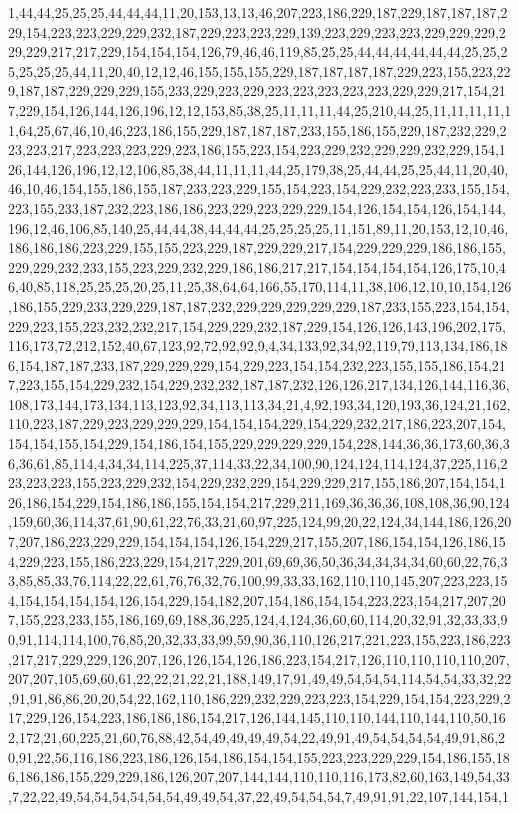 1,44,44,25,25,25,44,44,44,11,20,153,13,13,46,207,223,186,229,187,229,187,187,187,229,154,223,223,229,229,232,187,229,223,223,229,139,223,229,223,223,229,229,229,229,229,217,217,229,154,154,154,126,79,46,46,119,85,25,25,44,44,44,44,44,44,25,25,25,25,25,25,44,11,20,40,12,12,46,155,155,155,229,187,187,187,187,229,223,155,223,229,187,187,229,229,229,155,233,229,223,229,223,223,223,223,223,229,229,217,154,217,229,154,126,144,126,196,12,12,153,85,38,25,11,11,11,44,25,210,44,25,11,11,11,11,11,64,25,67,46,10,46,223,186,155,229,187,187,187,233,155,186,155,229,187,232,229,223,223,217,223,223,223,229,223,186,155,223,154,223,229,232,229,229,232,229,154,126,144,126,196,12,12,106,85,38,44,11,11,11,44,25,179,38,25,44,44,25,25,44,11,20,40,46,10,46,154,155,186,155,187,233,223,229,155,154,223,154,229,232,223,233,155,154,223,155,233,187,232,223,186,186,223,229,223,229,229,154,126,154,154,126,154,144,196,12,46,106,85,140,25,44,44,38,44,44,44,25,25,25,25,11,151,89,11,20,153,12,10,46,186,186,186,223,229,155,155,223,229,187,229,229,217,154,229,229,229,186,186,155,229,229,232,233,155,223,229,232,229,186,186,217,217,154,154,154,154,126,175,10,46,40,85,118,25,25,25,20,25,11,25,38,64,64,166,55,170,114,11,38,106,12,10,10,154,126,186,155,229,233,229,229,187,187,232,229,229,229,229,229,187,233,155,223,154,154,229,223,155,223,232,232,217,154,229,229,232,187,229,154,126,126,143,196,202,175,116,173,72,212,152,40,67,123,92,72,92,92,9,4,34,133,92,34,92,119,79,113,134,186,186,154,187,187,233,187,229,229,229,154,229,223,154,154,232,223,155,155,186,154,217,223,155,154,229,232,154,229,232,232,187,187,232,126,126,217,134,126,144,116,36,108,173,144,173,134,113,123,92,34,113,113,34,21,4,92,193,34,120,193,36,124,21,162,110,223,187,229,223,229,229,229,154,154,154,229,154,229,232,217,186,223,207,154,154,154,155,154,229,154,186,154,155,229,229,229,229,154,228,144,36,36,173,60,36,36,36,61,85,114,4,34,34,114,225,37,114,33,22,34,100,90,124,124,114,124,37,225,116,223,223,223,155,223,229,232,154,229,232,229,154,229,229,217,155,186,207,154,154,126,186,154,229,154,186,186,155,154,154,217,229,211,169,36,36,36,108,108,36,90,124,159,60,36,114,37,61,90,61,22,76,33,21,60,97,225,124,99,20,22,124,34,144,186,126,207,207,186,223,229,229,154,154,154,126,154,229,217,155,207,186,154,154,126,186,154,229,223,155,186,223,229,154,217,229,201,69,69,36,50,36,34,34,34,34,60,60,22,76,33,85,85,33,76,114,22,22,61,76,76,32,76,100,99,33,33,162,110,110,145,207,223,223,154,154,154,154,154,126,154,229,154,182,207,154,186,154,154,223,223,154,217,207,207,155,223,233,155,186,169,69,188,36,225,124,4,124,36,60,60,114,20,32,91,32,33,33,90,91,114,114,100,76,85,20,32,33,33,99,59,90,36,110,126,217,221,223,155,223,186,223,217,217,229,229,126,207,126,126,154,126,186,223,154,217,126,110,110,110,110,207,207,207,105,69,60,61,22,22,21,22,21,188,149,17,91,49,49,54,54,54,114,54,54,33,32,22,91,91,86,86,20,20,54,22,162,110,186,229,232,229,223,223,154,229,154,154,223,229,217,229,126,154,223,186,186,186,154,217,126,144,145,110,110,144,110,144,110,50,162,172,21,60,225,21,60,76,88,42,54,49,49,49,49,54,22,49,91,49,54,54,54,54,49,91,86,20,91,22,56,116,186,223,186,126,154,186,154,154,155,223,223,229,229,154,186,155,186,186,186,155,229,229,186,126,207,207,144,144,110,110,116,173,82,60,163,149,54,33,7,22,22,49,54,54,54,54,54,54,49,49,54,37,22,49,54,54,54,7,49,91,91,22,107,144,154,1